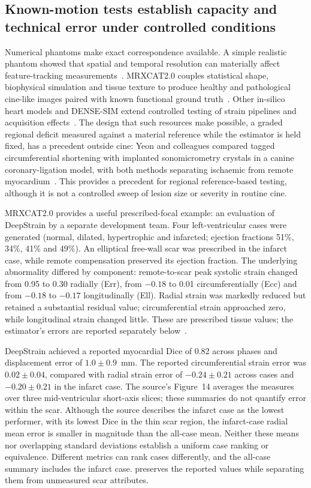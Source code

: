 \subsection{Known-motion tests establish capacity and technical error under controlled conditions}\label{sec:knownmotion}

Numerical phantoms make exact correspondence available. A simple realistic phantom showed that spatial and temporal resolution can materially affect feature-tracking measurements~\cite{adams2023}. MRXCAT2.0 couples statistical shape, biophysical simulation and tissue texture to produce healthy and pathological cine-like images paired with known functional ground truth~\cite{mrxcat2023}. Other in-silico heart models and DENSE-SIM extend controlled testing of strain pipelines and acquisition effects~\cite{mukherjee2024,barbaroux2025}. The design that such resources make possible, a graded regional deficit measured against a material reference while the estimator is held fixed, has a precedent outside cine: Yeon and colleagues compared tagged circumferential shortening with implanted sonomicrometry crystals in a canine coronary-ligation model, with both methods separating ischaemic from remote myocardium~\cite{yeon2001sonomicrometry}. This provides a precedent for regional reference-based testing, although it is not a controlled sweep of lesion size or severity in routine cine.

MRXCAT2.0 provides a useful prescribed-focal example: an evaluation of DeepStrain by a separate development team. Four left-ventricular cases were generated (normal, dilated, hypertrophic and infarcted; ejection fractions 51\%, 34\%, 41\% and 49\%). An elliptical free-wall scar was prescribed in the infarct case, while remote compensation preserved its ejection fraction. The underlying abnormality differed by component: remote-to-scar peak systolic strain changed from 0.95 to 0.30 radially (Err), from \(-0.18\) to 0.01 circumferentially (Ecc) and from \(-0.18\) to \(-0.17\) longitudinally (Ell). Radial strain was markedly reduced but retained a substantial residual value; circumferential strain approached zero, while longitudinal strain changed little. These are prescribed tissue values; the estimator's errors are reported separately below~\cite{mrxcat2023}.

DeepStrain achieved a reported myocardial Dice of 0.82 across phases and displacement error of \(1.0\pm0.9\)~mm. The reported circumferential strain error was \(0.02\pm0.04\), compared with radial strain error of \(-0.24\pm0.21\) across cases and \(-0.20\pm0.21\) in the infarct case. The source's Figure~14 averages the measures over three mid-ventricular short-axis slices; these summaries do not quantify error within the scar. Although the source describes the infarct case as the lowest performer, with its lowest Dice in the thin scar region, the infarct-case radial mean error is smaller in magnitude than the all-case mean. Neither these means nor overlapping standard deviations establish a uniform case ranking or equivalence. Different metrics can rank cases differently, and the all-case summary includes the infarct case.  preserves the reported values while separating them from unmeasured scar attributes.

